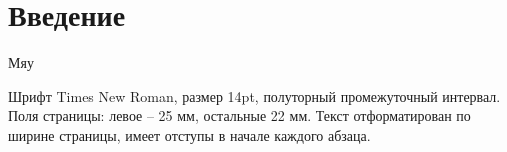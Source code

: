 \chapter{Введение}
\label{chap:intro}
Мяу \cite{A,B,C}

Шрифт Times New Roman, размер 14pt, полуторный промежуточный интервал.
Поля страницы: левое – 25 мм, остальные 22 мм.
Текст отформатирован по ширине страницы, имеет отступы в начале каждого абзаца.